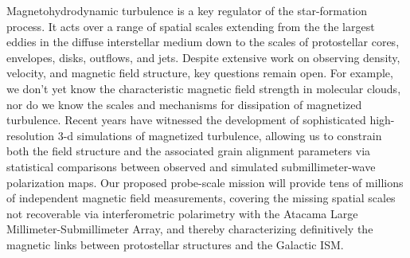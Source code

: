 \vspace{-0.05in}

Magnetohydrodynamic turbulence is a key regulator of the star-formation process. It acts over a range of spatial scales extending 
from the the largest eddies in the diffuse interstellar medium down to the scales of protostellar cores, envelopes, disks, outflows, and jets.  
Despite extensive work on observing density, velocity, and magnetic field structure, key questions remain open.  For example, 
we don't yet know the characteristic magnetic field strength in molecular clouds, nor do we know the scales and mechanisms for 
dissipation of magnetized turbulence.  Recent years have witnessed the development of sophisticated high-resolution 
3-d simulations of magnetized turbulence, allowing us to constrain both the field structure and the associated grain alignment 
parameters via statistical comparisons between observed and simulated submillimeter-wave polarization maps.  
Our proposed probe-scale mission will provide tens of millions of independent magnetic field measurements, 
covering the missing spatial scales not recoverable via interferometric polarimetry with the Atacama Large 
Millimeter-Submillimeter Array, and thereby characterizing definitively the magnetic links between protostellar structures and the Galactic ISM.






















